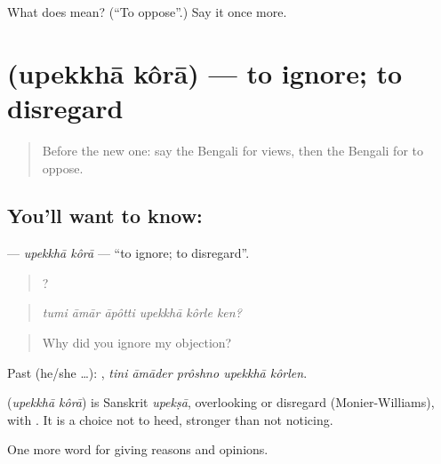 \begin{tcolorbox}[breakable,colback=teal!4,colframe=teal!35!black,title={Before you move on}]
What does   mean? (\textquotedblleft{}To oppose\textquotedblright{}.) Say it once more.
\end{tcolorbox}
\section[\texorpdfstring{\bn{উপেক্ষা} \bn{করা} (upekkhā kôrā)}{উপেক্ষা করা (upekkhā kôrā)}]{  (upekkhā kôrā) — to ignore; to disregard}

\label{lesson:BN-C334-upekkha-kora}



\begin{quote}
Before the new one: say the Bengali for views, then the Bengali for to oppose.
\end{quote}

\subsection*{You'll want to know:  }
\textbf{ } — \emph{upekkhā kôrā} — \textquotedblleft{}to ignore; to disregard\textquotedblright{}.

\begin{quote}
     ?
\end{quote}

\begin{quote}
\emph{tumi āmār āpôtti upekkhā kôrle ken?}
\end{quote}

\begin{quote}
Why did you ignore my objection?
\end{quote}

Past (he/she …):     , \emph{tini āmāder prôshno upekkhā kôrlen}.

\begin{cousinweb}
\textbf{ } (\emph{upekkhā kôrā}) is Sanskrit \emph{upekṣā}, overlooking or disregard (Monier-Williams), with . It is a choice not to heed, stronger than not noticing.
\end{cousinweb}

\begin{grammarlens}[title={What you've built}]
One more word for giving reasons and opinions.
\end{grammarlens}

